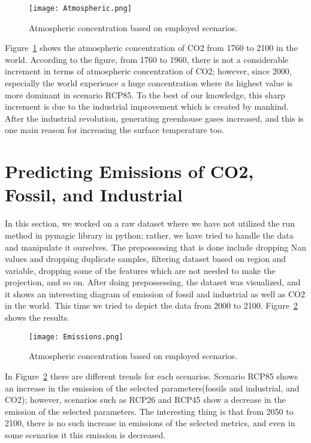 \documentclass[12pt]{article}
\begin{document}
\begin{figure}[H]
\centering
\texttt{[image: Atmospheric.png]}
\caption{Atmospheric concentration based on employed scenarios.}
\label{fig:atomospheric}
\end{figure}

Figure~\ref{fig:atomospheric} shows the atmospheric concentration of CO2 from 1760 to 2100 in the world. According to the figure, from 1760 to 1960, there is not a considerable increment in terms of atmospheric concentration of CO2; however, since 2000, especially the world experience a huge concentration where its highest value is more dominant in scenario RCP85. To the best of our knowledge, this sharp increment is due to the industrial improvement which is created by mankind. After the industrial revolution, generating greenhouse gases increased, and this is one main reason for increasing the surface temperature too.




\section{Predicting Emissions of CO2, Fossil, and Industrial}
\label{lab:stemp}

In this section, we worked on a raw dataset where we have not utilized the run method in pymagic library in python; rather, we have tried to handle the data and manipulate it ourselves. The prepossessing that is done include dropping Nan values and dropping duplicate samples, filtering dataset based on region and variable, dropping some of the features which are not needed to make the projection, and so on. After doing prepossessing, the dataset was visualized, and it shows an interesting diagram of emission of fossil and industrial as well as CO2 in the world. This time we tried to depict the data from 2000 to 2100. Figure~\ref{fig:emission} shows the results.


\begin{figure}[H]
\centering
\texttt{[image: Emissions.png]}
\caption{Atmospheric concentration based on employed scenarios.}
\label{fig:emission}
\end{figure}

In Figure~\ref{fig:emission} there are different trends for each scenarios. Scenario RCP85 shows an increase in the emission of the selected parameters(fossils and industrial, and CO2); however, scenarios such as RCP26 and RCP45 show a decrease in the emission of the selected parameters. The interesting thing is that from 2050 to 2100, there is no such increase in emissions of the selected metrics, and even in some scenarios it this emission is decreased. 
\end{document}
